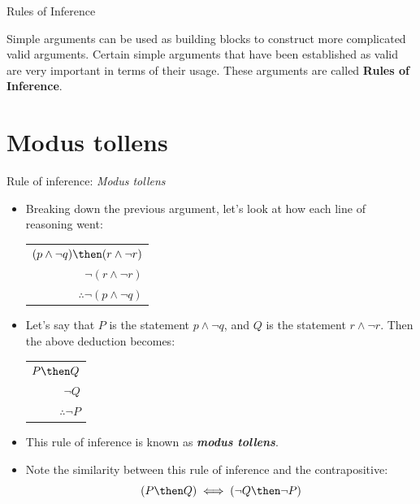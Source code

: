 \documentclass[12pt,aspectratio=1610, handout]{beamer}
\begin{document}
\begin{frame}{Rules of Inference}
	
	Simple arguments can be used as building blocks to construct more complicated valid arguments. Certain simple arguments that have been established as valid are very important in terms of their usage. These arguments are called \textbf{Rules of Inference}.
	
\end{frame}


\section{Modus tollens}
\begin{frame}{Rule of inference: \emph{Modus tollens}}
	\begin{itemize}
		\item Breaking down the previous argument, let's look at how each line of reasoning went: 
		\begin{center}
			\begin{tabular}{r}
				$(p \wedge \neg q) \then (r \wedge \neg r)$ \\
				$\neg(r \wedge \neg r)$ \\
				\hline
				$\therefore\neg(p \wedge \neg q) $
			\end{tabular}
		\end{center} \p
		\item Let's say that $P$ is the statement $p \wedge \neg q$, and $Q$ is the statement $r \wedge \neg r$. Then the above deduction becomes: 
		\begin{center}
			\begin{tabular}{r}
				$P \then Q$ \\
				$\neg Q$ \\
				\hline
				$\therefore\neg P$
			\end{tabular}
		\end{center}
		
%		 
		 \p
%		
	\item[\finger] This rule of inference is known as \emph{\textbf{modus tollens}}.  \p
		\item[\finger] Note the similarity between this rule of inference and the contrapositive: 
		\[
		(P \then Q) \iff (\neg Q \then \neg P)
		\]
	\end{itemize}
\end{frame}
\end{document}

